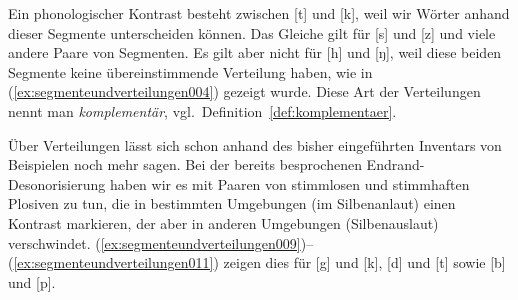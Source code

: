 
Ein phonologischer Kontrast besteht \zB zwischen [t] und [k], weil wir Wörter anhand dieser Segmente unterscheiden können.
Das Gleiche gilt für [s] und [z] und viele andere Paare von Segmenten.
Es gilt aber nicht für [h] und [ŋ], weil diese beiden Segmente keine übereinstimmende Verteilung haben, wie in (\ref{ex:segmenteundverteilungen004}) gezeigt wurde.
Diese Art der Verteilungen nennt man \textit{komplementär}, vgl.\ Definition~\ref{def:komplementaer}.


Über Verteilungen lässt sich schon anhand des bisher eingeführten Inventars von Beispielen noch mehr sagen.
Bei der bereits besprochenen Endrand-Desonorisierung haben wir es mit Paaren von stimmlosen und stimmhaften Plosiven zu tun, die in bestimmten Umgebungen (im Silbenanlaut) einen Kontrast markieren, der aber in anderen Umgebungen (Silbenauslaut) verschwindet.
(\ref{ex:segmenteundverteilungen009})--(\ref{ex:segmenteundverteilungen011}) zeigen dies für [g] und [k], [d] und [t] sowie [b] und [p].

\begin{exe}
  \ex\label{ex:segmenteundverteilungen009}
  \begin{xlist}
  \end{xlist}
  \ex\label{ex:segmenteundverteilungen010}
  \begin{xlist}
  \end{xlist}
  \ex\label{ex:segmenteundverteilungen011}
  \begin{xlist}
  \end{xlist}
\end{exe}

